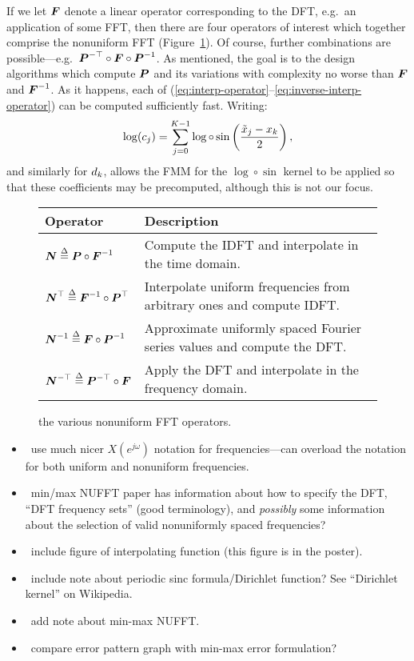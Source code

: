 If we let $\boldsymbol{F}$ denote a linear operator corresponding to the DFT,
e.g.\ an application of some FFT, then there are four operators of
interest which together comprise the nonuniform FFT
(Figure~\ref{fig:operators}).  Of course, further combinations are
possible---e.g.\ $\boldsymbol{P}^{-\top}\circ\boldsymbol{F}\circ\boldsymbol{P}^{-1}$. As
mentioned, the goal is to the design algorithms which compute
$\boldsymbol{P}$ and its variations with complexity no worse than $\boldsymbol{F}$
and $\boldsymbol{F}^{-1}$. As it happens, each of
(\ref{eq:interp-operator}--\ref{eq:inverse-interp-operator}) can be
computed sufficiently fast. Writing:
\begin{align}
  \label{eq:log-sin}
  \log(c_{j}) = \sum_{j=0}^{K-1} \log\circ\sin\left(\frac{{\tilde{x}}_{j}-{x}_{k}}{2}\right),
\end{align}
and similarly for $d_{k}$, allows the FMM for the
$\log\circ\sin$ kernel to be applied so that these coefficients may be
precomputed, although this is not our focus.

\begin{figure}[h]
  \centering
  \begin{tabular}[h]{ll}
    Operator & Description \\
    \midrule
    $\boldsymbol{N} \overset{\Delta}{=} \boldsymbol{P}\circ\boldsymbol{F}^{-1}$ & Compute the IDFT and interpolate in the time domain. \\
    $\boldsymbol{N}^\top \overset{\Delta}{=} \boldsymbol{F}^{-1}\circ\boldsymbol{P}^\top$ & Interpolate uniform frequencies from arbitrary ones and compute IDFT.\@ \\
    $\boldsymbol{N}^{-1} \overset{\Delta}{=} \boldsymbol{F}\circ\boldsymbol{P}^{-1}$ & Approximate uniformly spaced Fourier series values and compute the DFT.\@ \\
    $\boldsymbol{N}^{-\top} \overset{\Delta}{=} \boldsymbol{P}^{-\top}\circ\boldsymbol{F}$ & Apply the DFT and interpolate in the frequency domain. \\
  \end{tabular}
  \caption{the various nonuniform FFT operators.}\label{fig:operators}
\end{figure}

\begin{itemize}
\item \TODO\ use much nicer $X(e^{j\omega})$ notation for
  frequencies---can overload the notation for both uniform and
  nonuniform frequencies.
\item \TODO\ min/max NUFFT paper has information about how to specify
  the DFT, ``DFT frequency sets'' (good terminology), and
  \emph{possibly} some information about the selection of valid
  nonuniformly spaced frequencies?
\item \TODO\ include figure of interpolating function (this figure is
  in the poster).
\item \TODO\ include note about periodic sinc formula/Dirichlet
  function? See ``Dirichlet kernel'' on Wikipedia.
\item \TODO\ add note about min-max NUFFT.\@
\item \TODO\ compare error pattern graph with min-max error formulation?
\end{itemize}

